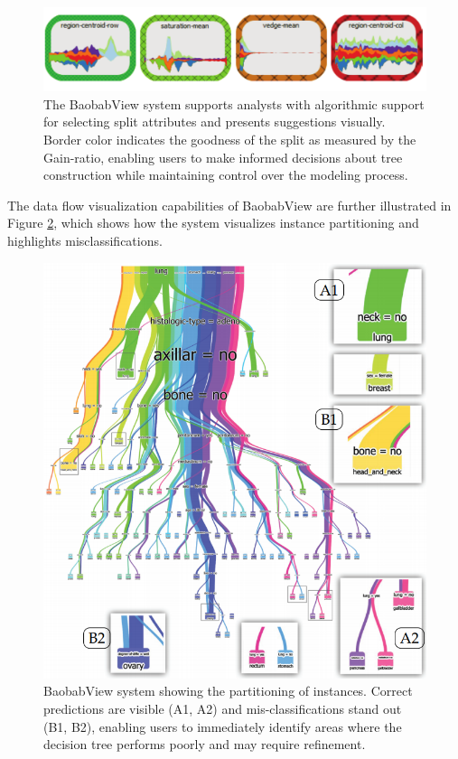 \begin{figure}[!htb]
    \centering
    \includegraphics[width=0.8\linewidth]{images/Baobab2.png}
    \caption{The BaobabView system supports analysts with algorithmic support for selecting split attributes and presents suggestions visually. Border color indicates the goodness of the split as measured by the Gain-ratio, enabling users to make informed decisions about tree construction while maintaining control over the modeling process.}
    \label{fig:baobab_algorithmic_support}
\end{figure}

The data flow visualization capabilities of BaobabView are further illustrated in Figure \ref{fig:baobab_partitioning}, which shows how the system visualizes instance partitioning and highlights misclassifications.

\begin{figure}[!htb]
    \centering
    \includegraphics[width=0.8\linewidth]{images/Baobab3.png}
    \caption{BaobabView system showing the partitioning of instances.
Correct predictions are visible (A1, A2) and mis-classifications stand out
(B1, B2), enabling users to immediately identify areas where the decision tree performs poorly and may require refinement.}
    \label{fig:baobab_partitioning}
\end{figure}

